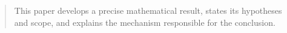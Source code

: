 \begin{abstract}
This paper develops a precise mathematical result, states its hypotheses and
scope, and explains the mechanism responsible for the conclusion.
\end{abstract}
